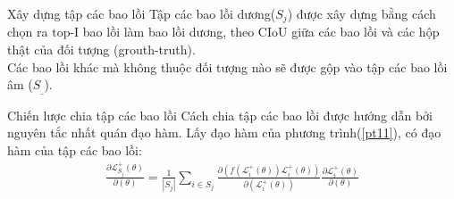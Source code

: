 \documentclass[11pt]{beamer}
\theoremstyle{definition}
\theoremstyle{plain}
\theoremstyle{plain}
\theoremstyle{remark}
\begin{document}
	\begin{frame}{Xây dựng tập các bao lồi}
		Tập các bao lồi dương($S_j$) được xây dựng bằng cách chọn ra $\text{top-I}$ bao lồi làm bao lồi dương, theo CIoU giữa các bao lồi và các hộp thật của đối tượng (grouth-truth).\\
		Các bao lồi khác mà không thuộc đối tượng nào sẽ được gộp vào tập các bao lồi âm ($S_{\_}$).
	\end{frame}
	
	
	
	\begin{frame}{Chiến lược chia tập các bao lồi}
		Cách chia tập các bao lồi được hướng dẫn bởi nguyên tắc nhất quán đạo hàm. Lấy đạo hàm của phương trình(\ref{pt11}), có đạo hàm của tập các bao lồi:
		\begin{align} \label{ptdd7}
			\frac{\partial\mathcal{L}_{S_j}^+ (\theta)}{\partial (\theta)} = \frac{1}{|S_j|} \sum_{i \in {S_j}} \frac{\partial (f(\mathcal{L}_i^+(\theta))\mathcal{L}_i^{+}(\theta))}{\partial (\mathcal{L}_i^+(\theta))} \frac{\partial \mathcal{L}_i^+ (\theta)}{\partial (\theta)}
		\end{align}
		
	\end{frame}
	
\end{document}
